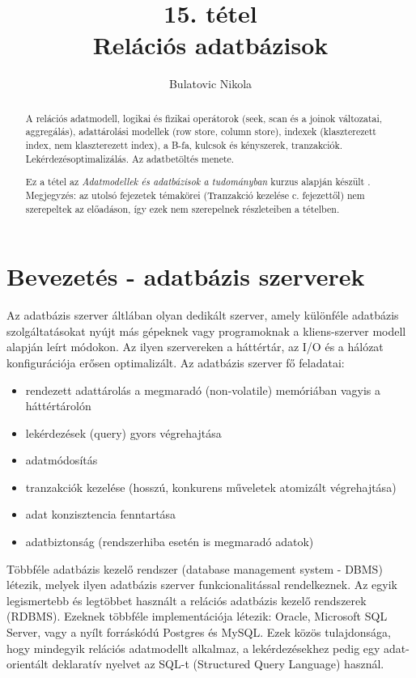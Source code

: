 \documentclass[12pt]{article}
\theoremstyle{plain}
\begin{document}
\title{15. tétel \\ Relációs adatbázisok}
\author{Bulatovic Nikola}

\maketitle

\begin{abstract}
     A relációs adatmodell, logikai és fizikai operátorok (seek, scan és a joinok változatai, aggregálás), adattárolási modellek (row store, column store), indexek (klaszterezett index, nem klaszterezett index), a B-fa, kulcsok és kényszerek, tranzakciók. Lekérdezésoptimalizálás. Az adatbetöltés menete. \par
     Ez a tétel az \textit{Adatmodellek és adatbázisok a tudományban} kurzus alapján készült \cite{db}. Megjegyzés: az utolsó fejezetek témakörei (Tranzakció kezelése c. fejezettől) nem szerepeltek az előadáson, így ezek nem szerepelnek részleteiben a tételben.
\end{abstract}

\tableofcontents
\newpage


\section{Bevezetés - adatbázis szerverek}

Az adatbázis szerver áltlában olyan dedikált szerver, amely különféle adatbázis szolgáltatásokat nyújt más gépeknek vagy programoknak a kliens-szerver modell alapján leírt módokon. Az ilyen szervereken a háttértár, az I/O és a hálózat konfigurációja erősen optimalizált. Az adatbázis szerver fő feladatai:
\begin{itemize}
    \item rendezett adattárolás a megmaradó (non-volatile) memóriában vagyis a háttértárolón
    \item lekérdezések (query) gyors végrehajtása
    \item adatmódosítás
    \item tranzakciók kezelése (hosszú, konkurens műveletek atomizált végrehajtása)
    \item adat konzisztencia fenntartása
    \item adatbiztonság (rendszerhiba esetén is megmaradó adatok)
\end{itemize}{}
Többféle adatbázis kezelő rendszer (database management system - DBMS) létezik, melyek ilyen adatbázis szerver funkcionalitással rendelkeznek. Az egyik legismertebb és legtöbbet használt a relációs adatbázis kezelő rendszerek (RDBMS). Ezeknek többféle implementációja létezik: Oracle, Microsoft SQL Server, vagy a nyílt forráskódú Postgres és MySQL. Ezek közös tulajdonsága, hogy mindegyik relációs adatmodellt alkalmaz, a lekérdezésekhez pedig egy adat-orientált deklaratív nyelvet az SQL-t (Structured Query Language) használ. 
\end{document}
